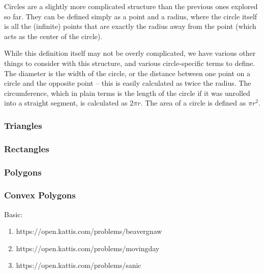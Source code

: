 Circles are a slightly more complicated structure than the previous ones explored so far. They can be defined simply as a point and a radius, where the circle itself is all the (infinite) points that are exactly the radius away from the point (which acts as the center of the circle).

While this definition itself may not be overly complicated, we have various other things to consider with this structure, and various circle-specific terms to define. The diameter is the width of the circle, or the distance between one point on a circle and the opposite point -- this is easily calculated as twice the radius. The circumference, which in plain terms is the length of the circle if it was unrolled into a straight segment, is calculated as $2 \pi r$. The area of a circle is defined as $\pi r^2$.


\subsubsection{Triangles}

\subsubsection{Rectangles}

\subsubsection{Polygons}

\subsubsection{Convex Polygons}

\hrulefill

Basic:
\begin{enumerate}
\item https://open.kattis.com/problems/beavergnaw
\item https://open.kattis.com/problems/movingday
\item https://open.kattis.com/problems/sanic
\end{enumerate}
